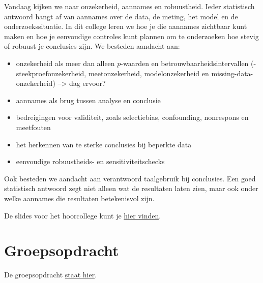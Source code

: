 \documentclass[
  letterpaper,
  DIV=11,
  numbers=noendperiod]{scrreprt}
\providecommand{\tightlist}{%
  \setlength{\itemsep}{0pt}\setlength{\parskip}{0pt}}
\begin{document}
\begin{tcolorbox}[enhanced jigsaw, arc=.35mm, bottomrule=.15mm, bottomtitle=1mm, breakable, colback=white, colbacktitle=quarto-callout-tip-color!10!white, colframe=quarto-callout-tip-color-frame, coltitle=black, left=2mm, leftrule=.75mm, opacityback=0, opacitybacktitle=0.6, rightrule=.15mm, title=\textcolor{quarto-callout-tip-color}{\faLightbulb}\hspace{0.5em}{Hoorcollege 23 juni 2026}, titlerule=0mm, toprule=.15mm, toptitle=1mm]

Vandaag kijken we naar onzekerheid, aannames en robuustheid. Ieder
statistisch antwoord hangt af van aannames over de data, de meting, het
model en de onderzoekssituatie. In dit college leren we hoe je die
aannames zichtbaar kunt maken en hoe je eenvoudige controles kunt
plannen om te onderzoeken hoe stevig of robuust je conclusies zijn. We
besteden aandacht aan:

\begin{itemize}
\tightlist
\item
  onzekerheid als meer dan alleen \(p\)-waarden en
  betrouwbaarheidsintervallen (- steekproefonzekerheid, meetonzekerheid,
  modelonzekerheid en missing-data-onzekerheid) --\textgreater{} dag
  ervoor?
\item
  aannames als brug tussen analyse en conclusie
\item
  bedreigingen voor validiteit, zoals selectiebias, confounding,
  nonrespons en meetfouten
\item
  het herkennen van te sterke conclusies bij beperkte data
\item
  eenvoudige robuustheids- en sensitiviteitschecks
\end{itemize}

Ook besteden we aandacht aan verantwoord taalgebruik bij conclusies. Een
goed statistisch antwoord zegt niet alleen wat de resultaten laten zien,
maar ook onder welke aannames die resultaten betekenisvol zijn.

De slides voor het hoorcollege kunt je \href{slides/lec-6.html}{hier
vinden}.

\end{tcolorbox}

\section{Groepsopdracht}\label{groepsopdracht-5}

De groepsopdracht \href{opdracht/Groepsopdracht6.html}{staat hier}.
\end{document}
